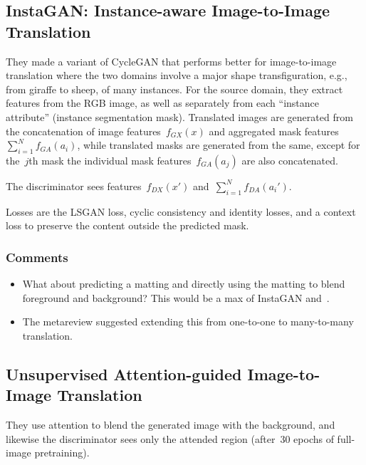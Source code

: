 \documentclass[a4paper, 12pt]{article}
\begin{document}
\subsection{InstaGAN: Instance-aware Image-to-Image
            Translation~\cite{mo2019instagan}}

They made a variant of CycleGAN that performs better for image-to-image
translation where the two domains involve a major shape transfiguration, e.g.,
from giraffe to sheep, of many instances.
For the source domain, they extract features from the RGB image, as well as
separately from each ``instance attribute'' (instance segmentation mask).
Translated images are generated from the concatenation of image
features~$f_{GX}(x)$ and aggregated mask features~$\sum_{i = 1}^N f_{GA}(a_i)$,
while translated masks are generated from the same, except for the~$j$th mask
the individual mask features~$f_{GA}(a_j)$ are also concatenated.

The discriminator sees features~$f_{DX}(x')$ and~$\sum_{i = 1}^N f_{DA}(a_i')$.

Losses are the LSGAN loss, cyclic consistency and identity losses, and a
context loss to preserve the content outside the predicted mask.

\subsubsection{Comments}

\begin{itemize}
        \item What about predicting a matting and directly using the matting to
                blend foreground and background? This would be a max of
                InstaGAN and~\cite{mejjati2018unsupervised}.

        \item The metareview suggested extending this from one-to-one to
                many-to-many translation.
\end{itemize}


\subsection{Unsupervised Attention-guided Image-to-Image
            Translation~\cite{mejjati2018unsupervised}}

They use attention to blend the generated image with the background, and
likewise the discriminator sees only the attended region (after~\num{30} epochs
of full-image pretraining).
\end{document}
